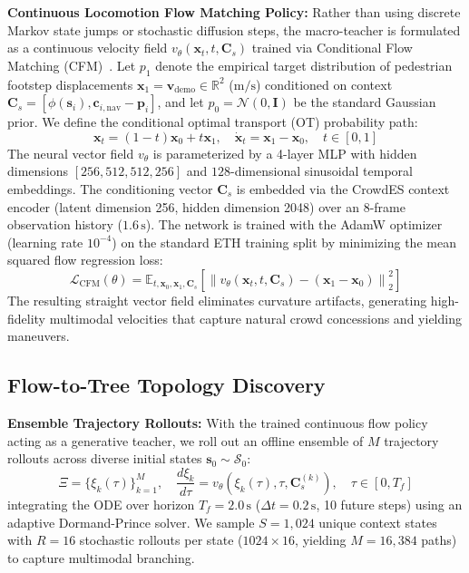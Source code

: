 \documentclass{sice-si}
\begin{document}
\textbf{Continuous Locomotion Flow Matching Policy:}
Rather than using discrete Markov state jumps or stochastic diffusion steps, the macro-teacher is formulated as a continuous velocity field $v_\theta(\mathbf{x}_t, t, \mathbf{C}_s)$ trained via Conditional Flow Matching (CFM)~\cite{lipman2023flow}. Let $p_1$ denote the empirical target distribution of pedestrian footstep displacements $\mathbf{x}_1 = \mathbf{v}_{\text{demo}} \in \mathbb{R}^2$ ($\text{m/s}$) conditioned on context $\mathbf{C}_s = [\phi(\mathbf{s}_i), \mathbf{c}_{i, \text{nav}} - \mathbf{p}_i]$, and let $p_0 = \mathcal{N}(0, \mathbf{I})$ be the standard Gaussian prior. We define the conditional optimal transport (OT) probability path:
\begin{equation}
    \mathbf{x}_t = (1 - t)\mathbf{x}_0 + t \mathbf{x}_1, \quad \dot{\mathbf{x}}_t = \mathbf{x}_1 - \mathbf{x}_0, \quad t \in [0, 1]
\end{equation}
The neural vector field $v_\theta$ is parameterized by a 4-layer MLP with hidden dimensions $[256, 512, 512, 256]$ and $128$-dimensional sinusoidal temporal embeddings. The conditioning vector $\mathbf{C}_s$ is embedded via the CrowdES context encoder (latent dimension 256, hidden dimension 2048) over an 8-frame observation history ($1.6\,\text{s}$). The network is trained with the AdamW optimizer (learning rate $10^{-4}$) on the standard ETH training split by minimizing the mean squared flow regression loss:
\begin{equation}
    \mathcal{L}_{\text{CFM}}(\theta) = \mathbb{E}_{t, \mathbf{x}_0, \mathbf{x}_1, \mathbf{C}_s} \left[ \left\| v_\theta(\mathbf{x}_t, t, \mathbf{C}_s) - (\mathbf{x}_1 - \mathbf{x}_0) \right\|_2^2 \right]
\end{equation}
The resulting straight vector field eliminates curvature artifacts, generating high-fidelity multimodal velocities that capture natural crowd concessions and yielding maneuvers.

\subsection{Flow-to-Tree Topology Discovery}
\textbf{Ensemble Trajectory Rollouts:}
With the trained continuous flow policy acting as a generative teacher, we roll out an offline ensemble of $M$ trajectory rollouts across diverse initial states $\mathbf{s}_0 \sim \mathcal{S}_0$:
\begin{equation}
    \Xi = \{\xi_k(\tau)\}_{k=1}^M, \quad \frac{d\xi_k}{d\tau} = v_\theta(\xi_k(\tau), \tau, \mathbf{C}_s^{(k)}), \quad \tau \in [0, T_f]
\end{equation}
integrating the ODE over horizon $T_f = 2.0\,\text{s}$ ($\Delta t = 0.2\,\text{s}$, 10 future steps) using an adaptive Dormand-Prince solver. We sample $S = 1,024$ unique context states with $R = 16$ stochastic rollouts per state ($1024 \times 16$, yielding $M = 16,384$ paths) to capture multimodal branching.
\end{document}
